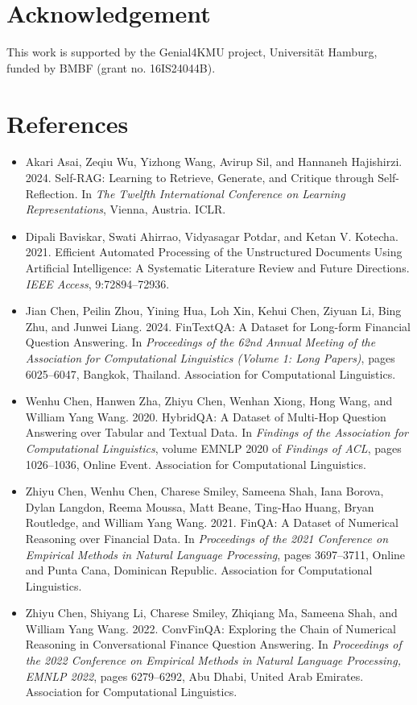 \documentclass[10pt]{article}
\begin{document}
\section*{Acknowledgement}
This work is supported by the Genial4KMU project, Universität Hamburg, funded by BMBF (grant no. 16IS24044B).

\section*{References}
\begin{itemize}
    \item Akari Asai, Zeqiu Wu, Yizhong Wang, Avirup Sil, and Hannaneh Hajishirzi. 2024. Self-RAG: Learning to Retrieve, Generate, and Critique through Self-Reflection. In \textit{The Twelfth International Conference on Learning Representations}, Vienna, Austria. ICLR.
    \item Dipali Baviskar, Swati Ahirrao, Vidyasagar Potdar, and Ketan V. Kotecha. 2021. Efficient Automated Processing of the Unstructured Documents Using Artificial Intelligence: A Systematic Literature Review and Future Directions. \textit{IEEE Access}, 9:72894--72936.
    \item Jian Chen, Peilin Zhou, Yining Hua, Loh Xin, Kehui Chen, Ziyuan Li, Bing Zhu, and Junwei Liang. 2024. FinTextQA: A Dataset for Long-form Financial Question Answering. In \textit{Proceedings of the 62nd Annual Meeting of the Association for Computational Linguistics (Volume 1: Long Papers)}, pages 6025--6047, Bangkok, Thailand. Association for Computational Linguistics.
    \item Wenhu Chen, Hanwen Zha, Zhiyu Chen, Wenhan Xiong, Hong Wang, and William Yang Wang. 2020. HybridQA: A Dataset of Multi-Hop Question Answering over Tabular and Textual Data. In \textit{Findings of the Association for Computational Linguistics}, volume EMNLP 2020 of \textit{Findings of ACL}, pages 1026--1036, Online Event. Association for Computational Linguistics.
    \item Zhiyu Chen, Wenhu Chen, Charese Smiley, Sameena Shah, Iana Borova, Dylan Langdon, Reema Moussa, Matt Beane, Ting-Hao Huang, Bryan Routledge, and William Yang Wang. 2021. FinQA: A Dataset of Numerical Reasoning over Financial Data. In \textit{Proceedings of the 2021 Conference on Empirical Methods in Natural Language Processing}, pages 3697--3711, Online and Punta Cana, Dominican Republic. Association for Computational Linguistics.
    \item Zhiyu Chen, Shiyang Li, Charese Smiley, Zhiqiang Ma, Sameena Shah, and William Yang Wang. 2022. ConvFinQA: Exploring the Chain of Numerical Reasoning in Conversational Finance Question Answering. In \textit{Proceedings of the 2022 Conference on Empirical Methods in Natural Language Processing, EMNLP 2022}, pages 6279--6292, Abu Dhabi, United Arab Emirates. Association for Computational Linguistics.

\end{itemize}
\end{document}
